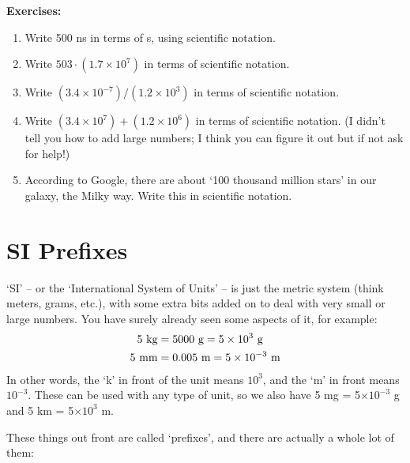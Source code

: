 \documentclass[12pt, letterpaper]{article}
\begin{document}
\clearpage
\textbf{Exercises:}

\begin{enumerate}
\item Write 500 ns in terms of s, using scientific notation.

\answergrid{5cm}
\item Write $503 \cdot (1.7 \times 10^{7})$ in terms of scientific notation.

\answergrid{5cm}
\item Write $(3.4 \times 10^{-7}) / (1.2 \times 10^{3})$ in terms of scientific notation.

\answergrid{5cm}
\item Write $(3.4 \times 10^{7}) + (1.2 \times 10^{6})$ in terms of scientific notation.  (I didn't tell you how to add large numbers; I think you can figure it out but if not ask for help!)

\answergrid{5cm}
\item According to Google, there are about `100 thousand million stars' in our galaxy, the Milky way.  Write this in scientific notation.

\answergrid{5cm}
\end{enumerate}

\section{SI Prefixes}
`SI' -- or the `International System of Units' -- is just the metric system (think meters, grams, etc.), with some extra bits added on to deal with very small or large numbers.
You have surely already seen some aspects of it, for example:
\begin{align}
	5 \textrm{ kg} &= 5000 \textrm{ g} = 5 \times 10^3 \textrm{ g}\\
	5 \textrm{ mm} &= 0.005 \textrm{ m} = 5 \times 10^{-3} \textrm{ m}
\end{align}
In other words, the `k' in front of the unit means $10^3$, and the `m' in front means $10^{-3}$.
These can be used with any type of unit, so we also have 5 mg = 5$\times10^{-3}$ g and 5 km = 5$\times10^{3}$ m.

These things out front are called `prefixes', and there are actually a whole lot of them:
\end{document}
